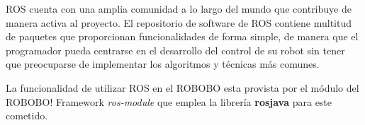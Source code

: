 
ROS cuenta con una amplia comunidad a lo largo del mundo que contribuye de manera activa al proyecto. 
El repositorio de software de ROS contiene multitud de paquetes que proporcionan funcionalidades de forma simple, de manera que el programador pueda centrarse en el desarrollo del control de su robot sin tener que preocuparse de implementar los algoritmos y técnicas más comunes.

La funcionalidad de utilizar ROS en el ROBOBO esta provista por el módulo del ROBOBO! Framework \textit{ros-module} que  emplea la librería \textbf{rosjava} para este cometido.











 